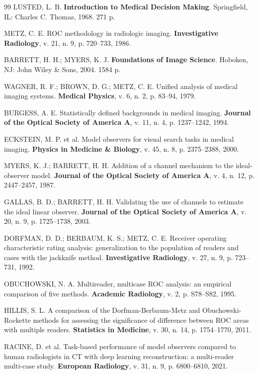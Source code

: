 \documentclass[
  12pt,
  a4paper,
  oneside
]{report}
\begin{document}
\begin{thebibliography}{99}
LUSTED, L. B. \textbf{Introduction to Medical Decision Making}. Springfield, IL: Charles C. Thomas, 1968. 271 p.

METZ, C. E. ROC methodology in radiologic imaging. \textbf{Investigative Radiology}, v. 21, n. 9, p. 720--733, 1986.

BARRETT, H. H.; MYERS, K. J. \textbf{Foundations of Image Science}. Hoboken, NJ: John Wiley \& Sons, 2004. 1584 p.

WAGNER, R. F.; BROWN, D. G.; METZ, C. E. Unified analysis of medical imaging systems. \textbf{Medical Physics}, v. 6, n. 2, p. 83--94, 1979.

BURGESS, A. E. Statistically defined backgrounds in medical imaging. \textbf{Journal of the Optical Society of America A}, v. 11, n. 4, p. 1237--1242, 1994.

ECKSTEIN, M. P. et al. Model observers for visual search tasks in medical imaging. \textbf{Physics in Medicine \& Biology}, v. 45, n. 8, p. 2375--2388, 2000.

MYERS, K. J.; BARRETT, H. H. Addition of a channel mechanism to the ideal-observer model. \textbf{Journal of the Optical Society of America A}, v. 4, n. 12, p. 2447--2457, 1987.

GALLAS, B. D.; BARRETT, H. H. Validating the use of channels to estimate the ideal linear observer. \textbf{Journal of the Optical Society of America A}, v. 20, n. 9, p. 1725--1738, 2003.

DORFMAN, D. D.; BERBAUM, K. S.; METZ, C. E. Receiver operating characteristic rating analysis: generalization to the population of readers and cases with the jackknife method. \textbf{Investigative Radiology}, v. 27, n. 9, p. 723--731, 1992.

OBUCHOWSKI, N. A. Multireader, multicase ROC analysis: an empirical comparison of five methods. \textbf{Academic Radiology}, v. 2, p. S78--S82, 1995.

HILLIS, S. L. A comparison of the Dorfman-Berbaum-Metz and Obuchowski-Rockette methods for assessing the significance of difference between ROC areas with multiple readers. \textbf{Statistics in Medicine}, v. 30, n. 14, p. 1754--1770, 2011.

RACINE, D. et al. Task-based performance of model observers compared to human radiologists in CT with deep learning reconstruction: a multi-reader multi-case study. \textbf{European Radiology}, v. 31, n. 9, p. 6800--6810, 2021.


\end{thebibliography}
\end{document}
